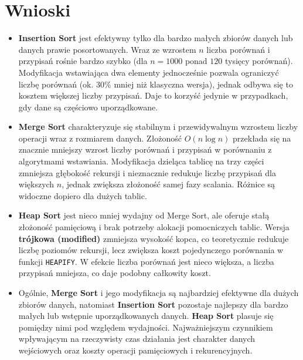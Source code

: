 \documentclass{article}
\begin{document}
\section{Wnioski}
\begin{itemize}
    \item \textbf{Insertion Sort} jest efektywny tylko dla bardzo małych zbiorów danych lub danych prawie posortowanych. Wraz ze wzrostem $n$ liczba porównań i przypisań rośnie bardzo szybko (dla $n=1000$ ponad $120$ tysięcy porównań). Modyfikacja wstawiająca dwa elementy jednocześnie pozwala ograniczyć liczbę porównań (ok. $30\%$ mniej niż klasyczna wersja), jednak odbywa się to kosztem większej liczby przypisań. Daje to korzyść jedynie w przypadkach, gdy dane są częściowo uporządkowane.

    \item \textbf{Merge Sort} charakteryzuje się stabilnym i przewidywalnym wzrostem liczby operacji wraz z rozmiarem danych. Złożoność $O(n \log n)$ przekłada się na znacznie mniejszy wzrost liczby porównań i przypisań w porównaniu z algorytmami wstawiania. Modyfikacja dzieląca tablicę na trzy części zmniejsza głębokość rekursji i nieznacznie redukuje liczbę przypisań dla większych $n$, jednak zwiększa złożoność samej fazy scalania. Różnice są widoczne dopiero dla dużych tablic.

    \item \textbf{Heap Sort} jest nieco mniej wydajny od Merge Sort, ale oferuje stałą złożoność pamięciową i brak potrzeby alokacji pomocniczych tablic. Wersja \textbf{trójkowa (modified)} zmniejsza wysokość kopca, co teoretycznie redukuje liczbę poziomów rekursji, lecz zwiększa koszt pojedynczego porównania w funkcji \texttt{HEAPIFY}. W efekcie liczba porównań jest nieco większa, a liczba przypisań mniejsza, co daje podobny całkowity koszt.

    \item Ogólnie, \textbf{Merge Sort} i jego modyfikacja są najbardziej efektywne dla dużych zbiorów danych, natomiast \textbf{Insertion Sort} pozostaje najlepszy dla bardzo małych lub wstępnie uporządkowanych danych. \textbf{Heap Sort} plasuje się pomiędzy nimi pod względem wydajności. Najważniejszym czynnikiem wpływającym na rzeczywisty czas działania jest charakter danych wejściowych oraz koszty operacji pamięciowych i rekurencyjnych.
\end{itemize}
\end{document}
